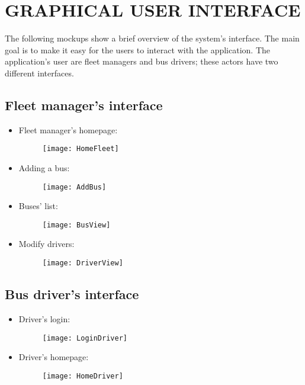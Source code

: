 \section{GRAPHICAL USER INTERFACE}
The following mockups show a brief overview of the system’s interface. The main goal is to make it easy for the users to interact with the application.
The application’s user are fleet managers and bus drivers; these actors have two different interfaces.
\subsection{Fleet manager's interface}
\begin{itemize}
	\item Fleet manager's homepage:
	\begin{figure}[H]
		\centering
		\texttt{[image: HomeFleet]}
	\end{figure} 
	\newpage
	\item Adding a bus:
	\begin{figure}[H]
		\centering
		\texttt{[image: AddBus]}
	\end{figure}
	\newpage
	\item Buses' list:
	\begin{figure}[H]
		\centering
		\texttt{[image: BusView]}
	\end{figure}
	\newpage
	\item Modify drivers:
	\begin{figure}[H]
		\centering
		\texttt{[image: DriverView]}
	\end{figure}
\end{itemize}
\newpage
\subsection{Bus driver's interface}
\begin{itemize}
	\item Driver's login:
	\begin{figure}[H]
		\centering
		\texttt{[image: LoginDriver]}
	\end{figure}
\item Driver's homepage:
\begin{figure}[H]
	\centering
	\texttt{[image: HomeDriver]}
\end{figure}
\end{itemize}